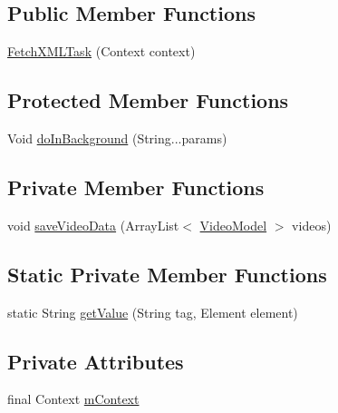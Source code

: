 \subsection*{Public Member Functions}
\begin{DoxyCompactItemize}
\item 
\hyperlink{classorg_1_1buildmlearn_1_1videocollection_1_1data_1_1FetchXMLTask_a5601d8016142204920c59917956e9324}{Fetch\+X\+M\+L\+Task} (Context context)
\end{DoxyCompactItemize}
\subsection*{Protected Member Functions}
\begin{DoxyCompactItemize}
\item 
Void \hyperlink{classorg_1_1buildmlearn_1_1videocollection_1_1data_1_1FetchXMLTask_acadb6a3a611337628bbc1a39f3049b46}{do\+In\+Background} (String...\+params)
\end{DoxyCompactItemize}
\subsection*{Private Member Functions}
\begin{DoxyCompactItemize}
\item 
void \hyperlink{classorg_1_1buildmlearn_1_1videocollection_1_1data_1_1FetchXMLTask_ab48ff6536010be308edb41f3a834a677}{save\+Video\+Data} (Array\+List$<$ \hyperlink{classorg_1_1buildmlearn_1_1videocollection_1_1data_1_1VideoModel}{Video\+Model} $>$ videos)
\end{DoxyCompactItemize}
\subsection*{Static Private Member Functions}
\begin{DoxyCompactItemize}
\item 
static String \hyperlink{classorg_1_1buildmlearn_1_1videocollection_1_1data_1_1FetchXMLTask_ab2804ce31a94506d089740b9e6860704}{get\+Value} (String tag, Element element)
\end{DoxyCompactItemize}
\subsection*{Private Attributes}
\begin{DoxyCompactItemize}
\item 
final Context \hyperlink{classorg_1_1buildmlearn_1_1videocollection_1_1data_1_1FetchXMLTask_a90716de3c4654a2d1730be9124627bac}{m\+Context}
\end{DoxyCompactItemize}


